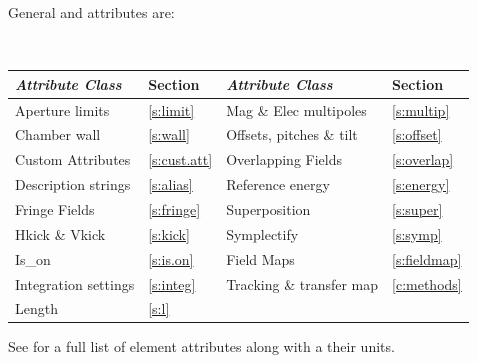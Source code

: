 General  and  attributes are:
\begin{center}
\tt
\begin{tabular}{llll} \toprule
  {\sl Attribute Class}      & Section           & {\sl Attribute Class}      & Section          \\ \midrule
  Aperture limits            & \ref{s:limit}     & Mag \& Elec multipoles     & \ref{s:multip}   \\ 
  Chamber wall               & \ref{s:wall}      & Offsets, pitches \& tilt   & \ref{s:offset}   \\
  Custom Attributes          & \ref{s:cust.att}  & Overlapping Fields         & \ref{s:overlap}  \\
  Description strings        & \ref{s:alias}     & Reference energy           & \ref{s:energy}   \\ 
  Fringe Fields              & \ref{s:fringe}    & Superposition              & \ref{s:super}    \\
  Hkick \& Vkick             & \ref{s:kick}      & Symplectify                & \ref{s:symp}     \\
  Is_on                      & \ref{s:is.on}     & Field Maps                 & \ref{s:fieldmap} \\
  Integration settings       & \ref{s:integ}     & Tracking \& transfer map   & \ref{c:methods}  \\
  Length                     & \ref{s:l}         &                            &                  \\
  \bottomrule
\end{tabular}
\end{center}
\toffset
See  for a full list of element attributes along with a their units.

